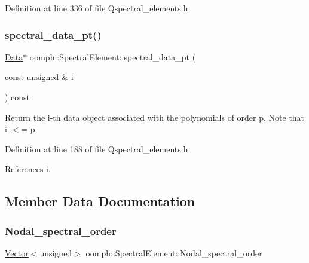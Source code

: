 Definition at line 336 of file Qspectral\+\_\+elements.\+h.

\mbox{\label{classoomph_1_1SpectralElement_aa23ecaa19fb8eb9a64243b3053f5322c}} 
\subsubsection{\texorpdfstring{spectral\+\_\+data\+\_\+pt()}{spectral\_data\_pt()}}
{\footnotesize\ttfamily \hyperlink{classoomph_1_1Data}{Data}$\ast$ oomph\+::\+Spectral\+Element\+::spectral\+\_\+data\+\_\+pt (\begin{DoxyParamCaption}\item[{const unsigned \&}]{i }\end{DoxyParamCaption}) const\hspace{0.3cm}{\ttfamily [inline]}}



Return the i-\/th data object associated with the polynomials of order p. Note that i $<$= p. 



Definition at line 188 of file Qspectral\+\_\+elements.\+h.



References i.



\subsection{Member Data Documentation}
\mbox{\label{classoomph_1_1SpectralElement_ad4be04e6b166472ca5f18d4678884994}} 
\subsubsection{\texorpdfstring{Nodal\+\_\+spectral\+\_\+order}{Nodal\_spectral\_order}}
{\footnotesize\ttfamily \hyperlink{classoomph_1_1Vector}{Vector}$<$unsigned$>$ oomph\+::\+Spectral\+Element\+::\+Nodal\+\_\+spectral\+\_\+order\hspace{0.3cm}{\ttfamily [protected]}}



